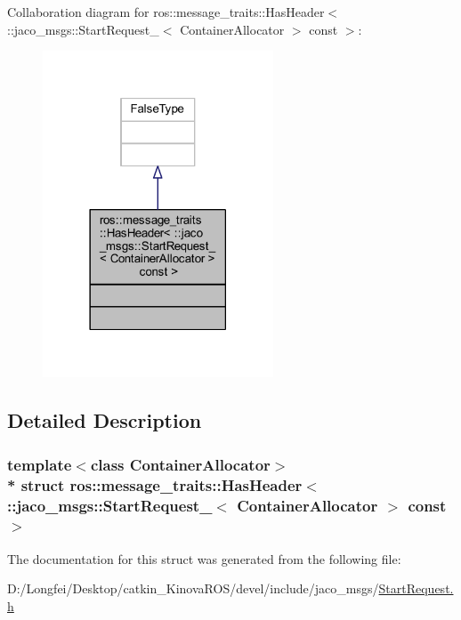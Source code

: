 Collaboration diagram for ros\+:\+:message\+\_\+traits\+:\+:Has\+Header$<$ \+:\+:jaco\+\_\+msgs\+:\+:Start\+Request\+\_\+$<$ Container\+Allocator $>$ const $>$\+:
\nopagebreak
\begin{figure}[H]
\begin{center}
\leavevmode
\includegraphics[width=194pt]{d3/d2b/structros_1_1message__traits_1_1HasHeader_3_01_1_1jaco__msgs_1_1StartRequest___3_01ContainerAllo55b45fef267aca300a71682764c76fa4}
\end{center}
\end{figure}


\subsection{Detailed Description}
\subsubsection*{template$<$class Container\+Allocator$>$\\*
struct ros\+::message\+\_\+traits\+::\+Has\+Header$<$ \+::jaco\+\_\+msgs\+::\+Start\+Request\+\_\+$<$ Container\+Allocator $>$ const  $>$}



The documentation for this struct was generated from the following file\+:\begin{DoxyCompactItemize}
\item 
D\+:/\+Longfei/\+Desktop/catkin\+\_\+\+Kinova\+R\+O\+S/devel/include/jaco\+\_\+msgs/\hyperlink{StartRequest_8h}{Start\+Request.\+h}\end{DoxyCompactItemize}
